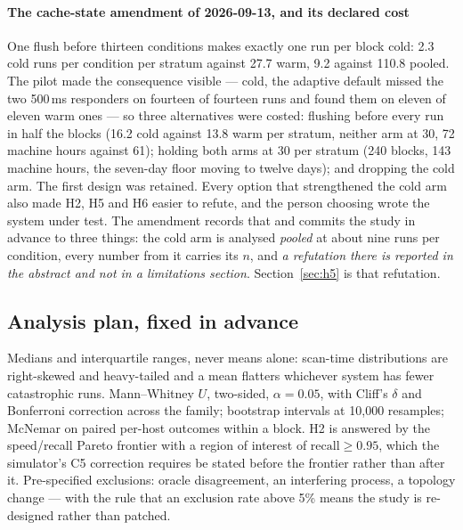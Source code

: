 \documentclass[conference]{IEEEtran}
\begin{document}
\paragraph*{The cache-state amendment of 2026-09-13, and its declared cost}
One flush before thirteen conditions makes exactly one run per block cold: 2.3
cold runs per condition per stratum against 27.7 warm, 9.2 against 110.8
pooled. The pilot made the consequence visible --- cold, the adaptive default
missed the two 500\,ms responders on fourteen of fourteen runs and found them
on eleven of eleven warm ones --- so three alternatives were costed: flushing
before every run in half the blocks (16.2 cold against 13.8 warm per stratum,
neither arm at 30, 72 machine hours against 61); holding both arms at 30 per
stratum (240 blocks, 143 machine hours, the seven-day floor moving to twelve
days); and dropping the cold arm. The first design was retained. Every option
that strengthened the cold arm also made H2, H5 and H6 easier to refute, and
the person choosing wrote the system under test. The amendment records that and
commits the study in advance to three things: the cold arm is analysed
\emph{pooled} at about nine runs per condition, every number from it carries
its $n$, and \emph{a refutation there is reported in the abstract and not in a
limitations section}. Section~\ref{sec:h5} is that refutation.

\subsection{Analysis plan, fixed in advance}
\label{sec:plan}

Medians and interquartile ranges, never means alone: scan-time distributions
are right-skewed and heavy-tailed and a mean flatters whichever system has
fewer catastrophic runs. Mann--Whitney $U$, two-sided, $\alpha=0.05$, with
Cliff's $\delta$ and Bonferroni correction across the family; bootstrap
intervals at 10{,}000 resamples; McNemar on paired per-host outcomes within a
block. H2 is answered by the speed/recall Pareto frontier with a region of
interest of $\mathrm{recall}\ge0.95$, which the simulator's C5 correction
requires be stated before the frontier rather than after it. Pre-specified
exclusions: oracle disagreement, an interfering process, a topology change ---
with the rule that an exclusion rate above 5\% means the study is re-designed
rather than patched.
\end{document}
